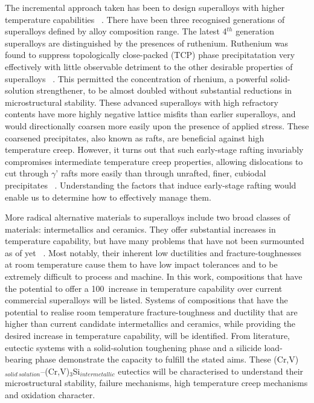 The incremental approach taken has been to design superalloys with higher temperature capabilities ~\cite{reed06, cumpsty97}.  There have been three recognised generations of superalloys defined by alloy composition range.  The latest 4$^{th}$ generation superalloys are distinguished by the presences of ruthenium.  Ruthenium was found to suppress topologically close-packed (TCP) phase precipitatation very effectively with little observable detriment to the other desirable properties of superalloys ~\cite{yeh04}.  This permitted the concentration of rhenium, a powerful solid-solution strengthener, to be almost doubled without substantial reductions in microstructural stability.  These advanced superalloys with high refractory contents have more highly negative lattice misfits than earlier superalloys, and would directionally coarsen more easily upon the presence of applied stress.  These coarsened precipitates, also known as rafts, are beneficial against high temperature creep.  However, it turns out that such early-stage rafting invariably compromises intermediate temperature creep properties, allowing dislocations to cut through $\gamma$' rafts more easily than through unrafted, finer, cubiodal precipitates ~\cite{hobbs08}.  Understanding the factors that induce early-stage rafting would enable us to determine how to effectively manage them. 

More radical alternative materials to superalloys include two broad classes of materials: intermetallics and ceramics.  They offer substantial increases in temperature capability, but have many problems that have not been surmounted as of yet ~\cite{chang91, fleischer94, fleischer85a,  jackson96, kelly91, kelly96, kumar94,miracle94b, sauthoff88, shah92}.  Most notably, their inherent low ductilities and fracture-toughnesses at room temperature cause them to have low impact tolerances and to be extremely difficult to process and machine.  In this work, compositions that have the potential to offer a 100\celsius\ increase in temperature capability over current commercial superalloys will be listed.  Systems of compositions that have the potential to realise room temperature fracture-toughness and ductility that are higher than current candidate intermetallics and ceramics, while providing the desired increase in temperature capability, will be identified.  From literature, eutectic systems with a solid-solution toughening phase and a silicide load-bearing phase demonstrate the capacity to fulfill the stated aims.  These (Cr,V)$_{solid\ solution}$--(Cr,V)$_3$Si$_{intermetallic}$ eutectics will be characterised to understand their microstructural stability, failure mechanisms, high temperature creep mechanisms and oxidation character.
 
